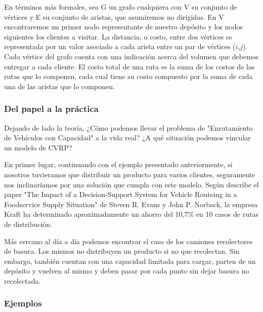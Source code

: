 En términos más formales, sea G un grafo cualquiera con V su conjunto de vértices y E su conjunto de aristas, que asumiremos no dirigidas. En V encontraremos un primer nodo representante de nuestro depósito y los nodos siguientes los clientes a visitar. La distancia, o costo, entre dos vértices es representada por un valor asociado a cada arista entre un par de vértices ($i$,$j$). Cada vértice del grafo cuenta con una indicación acerca del volumen que debemos entregar a cada cliente. El costo total de una ruta es la suma de los costos de las rutas que lo componen, cada cual tiene su costo compuesto por la suma de cada una de las aristas que lo componen.

\subsubsection{Del papel a la práctica}
Dejando de lado la teoría, ¿Cómo podemos llevar el problema de "Enrutamiento de Vehículos con Capacidad" a la vida real? ¿A qué situación podemos vincular un modelo de CVRP?

En primer lugar, continuando con el ejemplo presentado anteriormente, si nosotros tuvieramos que distribuir un producto para varios clientes, seguramente nos inclinaríamos por una solución que cumpla con este modelo. Según describe el paper "The Impact of a Decision-Support System for Vehicle Routeing in a Foodservice Supply Situation" de Steven R. Evans y John P. Norback, la empresa Kraft ha determinado aproximadamente un ahorro del 10,7\% en 10 casos de rutas de distribución.

Más cercano al día a día podemos encontrar el caso de los camiones recolectores de basura. Los mismos no distribuyen un producto si no que recolectan. Sin embargo, también cuentan con una capacidad limitada para cargar, parten de un depósito y vuelven al mismo y deben pasar por cada punto sin dejar basura no recolectada.

\subsubsection{Ejemplos}